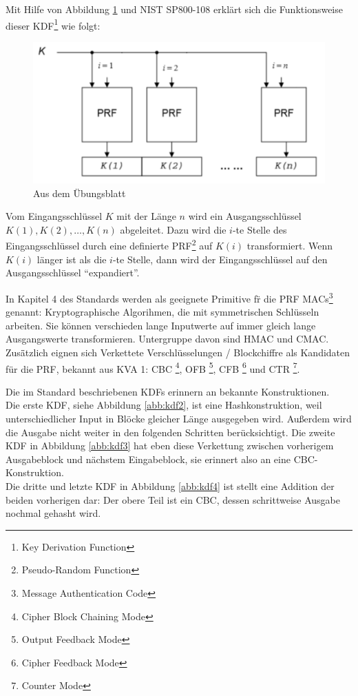 \documentclass[a4paper]{uebungsblatt}
\begin{document}
\begin{aufgabe}[a]
	\teilaufgabe
	Mit Hilfe von Abbildung \ref{abb:kdf1} und NIST SP800-108 erkl\"art sich die Funktionsweise dieser KDF\footnote{Key Derivation Function} wie folgt: 
	\begin{figure}[H]
		\centering
		\includegraphics[scale=0.6]{kdf1.png}
		\caption{Aus dem \"Ubungsblatt}\label{abb:kdf1}
	\end{figure}
	Vom Eingangsschl\"ussel $ K $ mit der L\"ange $ n $ wird ein Ausgangsschl\"ussel $ K(1),K(2),\ldots,K(n) $ abgeleitet. Dazu wird die $ i $-te Stelle des Eingangsschl\"ussel durch eine definierte PRF\footnote{Pseudo-Random Function} auf $ K(i) $ transformiert. Wenn $ K(i) $ l\"anger ist als die $ i $-te Stelle, dann wird der Eingangsschl\"ussel auf den Ausgangsschl\"ussel \enquote{expandiert}.
	
	\teilaufgabe
	In Kapitel 4 des Standards werden als geeignete Primitive f\"r die PRF MACs\footnote{Message Authentication Code} genannt: Kryptographische Algorihmen, die mit symmetrischen Schl\"usseln arbeiten. Sie k\"onnen verschieden lange Inputwerte auf immer gleich lange Ausgangswerte transformieren. Untergruppe davon sind HMAC und CMAC.\\
	Zus\"ätzlich eignen sich Verkettete Verschl\"usselungen / Blockchiffre als Kandidaten f\"ur die PRF, bekannt aus KVA 1: CBC \footnote{Cipher Block Chaining Mode}, OFB \footnote{Output Feedback Mode}, CFB \footnote{Cipher Feedback Mode} und CTR \footnote{Counter Mode}. 
	
	\teilaufgabe
	Die im Standard beschriebenen KDFs erinnern an bekannte Konstruktionen.\\
	Die erste KDF, siehe Abbildung \ref{abb:kdf2}, ist eine Hashkonstruktion, weil unterschiedlicher Input in Bl\"ocke gleicher L\"ange ausgegeben wird. Au{\ss}erdem wird die Ausgabe nicht weiter in den folgenden Schritten ber\"ucksichtigt. Die zweite KDF in Abbildung \ref{abb:kdf3} hat eben diese Verkettung zwischen vorherigem Ausgabeblock und n\"achstem Eingabeblock, sie erinnert also an eine CBC-Konstruktion.\\
	Die dritte und letzte KDF in Abbildung \ref{abb:kdf4} ist stellt eine Addition der beiden vorherigen dar: Der obere Teil ist ein CBC, dessen schrittweise Ausgabe nochmal gehasht wird.
	

\end{aufgabe}
\end{document}
